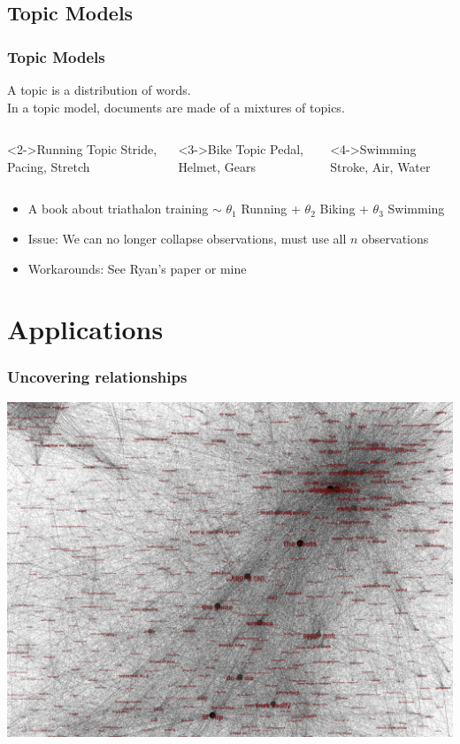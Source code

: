 \documentclass[presentation]{beamer}
\begin{document}
\subsection{Topic Models}
\begin{frame}
 \frametitle{Topic Models}
A topic is a distribution of words. \\
In a topic model, documents are made of a mixtures of topics. 
\begin{columns}
\begin{block}<2->{Running Topic}
Stride, Pacing, Stretch
\end{block}
\begin{block}<3->{Bike Topic}
Pedal, Helmet, Gears
\end{block}
\begin{block}<4->{Swimming}
Stroke, Air, Water
\end{block}
\end{columns}
\begin{itemize}
\item<5-> A book about triathalon training $\sim$ $\theta_1$ Running + $\theta_2$ Biking + $\theta_3$ Swimming
\item<6-> Issue: We can no longer collapse observations, must use all $n$ observations
\item <7-> Workarounds: See Ryan's paper\footnotemark {}
or mine \footnotemark {}
\end{itemize}
\end{frame}

\section{Applications}

\begin{frame}
\frametitle{Uncovering relationships}
\pause
\begin{center}
\includegraphics[height=.8\textheight]{Images/lyricsnetwork.png}
\end{center}
\end{frame}
\end{document}
